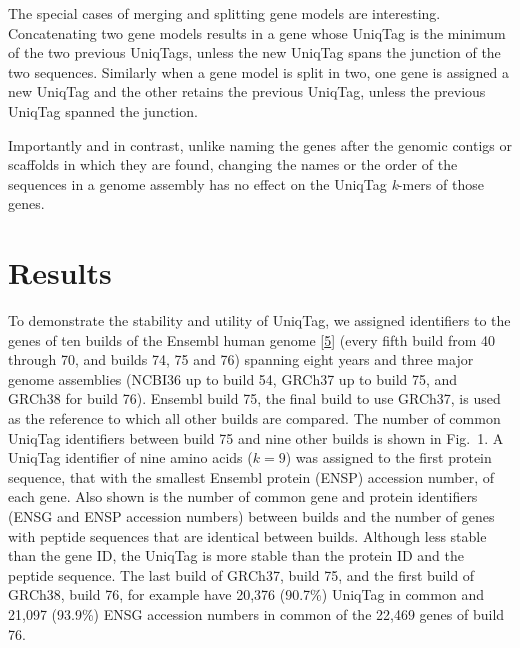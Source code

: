 \documentclass[10pt]{article}
\begin{document}
The special cases of merging and splitting gene models are interesting.
Concatenating two gene models results in a gene whose UniqTag is the
minimum of the two previous UniqTags, unless the new UniqTag spans the
junction of the two sequences. Similarly when a gene model is split in
two, one gene is assigned a new UniqTag and the other retains the
previous UniqTag, unless the previous UniqTag spanned the junction.

Importantly and in contrast, unlike naming the genes after the genomic
contigs or scaffolds in which they are found, changing the names or the
order of the sequences in a genome assembly has no effect on the UniqTag
\emph{k}-mers of those genes.

\section{Results}\label{results}

To demonstrate the stability and utility of UniqTag, we assigned
identifiers to the genes of ten builds of the Ensembl human genome
{[}\href{http://dx.doi.org/10.1093/nar/gku1010}{5}{]} (every fifth build
from 40 through 70, and builds 74, 75 and 76) spanning eight years and
three major genome assemblies (NCBI36 up to build 54, GRCh37 up to build
75, and GRCh38 for build 76). Ensembl build 75, the final build to use
GRCh37, is used as the reference to which all other builds are compared.
The number of common UniqTag identifiers between build 75 and nine other
builds is shown in Fig.~1. A UniqTag identifier of nine amino acids
(\(k=9\)) was assigned to the first protein sequence, that with the
smallest Ensembl protein (ENSP) accession number, of each gene. Also
shown is the number of common gene and protein identifiers (ENSG and
ENSP accession numbers) between builds and the number of genes with
peptide sequences that are identical between builds. Although less
stable than the gene ID, the UniqTag is more stable than the protein ID
and the peptide sequence. The last build of GRCh37, build 75, and the
first build of GRCh38, build 76, for example have 20,376 (90.7\%)
UniqTag in common and 21,097 (93.9\%) ENSG accession numbers in common
of the 22,469 genes of build 76.
\end{document}
